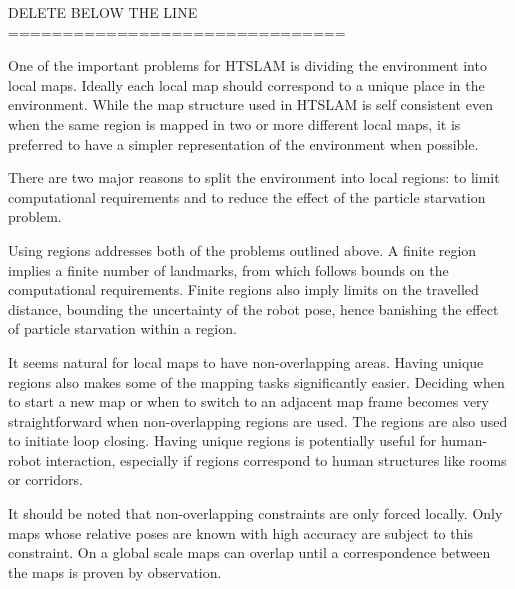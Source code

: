 DELETE BELOW THE LINE\\
===============================

One of the important problems for HTSLAM is dividing the environment
into local maps. Ideally each local map should correspond to a unique
place in the environment. While the map structure used in HTSLAM is
self consistent even when the same region is mapped in two or more
different local maps, it is preferred to have a simpler representation
of the environment when possible.

There are two major reasons to split the environment into local
regions: to limit computational requirements and to reduce the effect
of the particle starvation problem.

Using regions addresses both of the problems outlined above. A finite
region implies a finite number of landmarks, from which follows bounds
on the computational requirements. Finite regions also imply limits on
the travelled distance, bounding the uncertainty of the robot pose,
hence banishing the effect of particle starvation within a region.

It seems natural for local maps to have non-overlapping areas. Having
unique regions also makes some of the mapping tasks significantly
easier. Deciding when to start a new map or when to switch to an
adjacent map frame becomes very straightforward when non-overlapping
regions are used. The regions are also used to initiate loop
closing. Having unique regions is potentially useful for human-robot
interaction, especially if regions correspond to human structures
like rooms or corridors.

It should be noted that non-overlapping constraints are only forced
locally. Only maps whose relative poses are known with high accuracy
are subject to this constraint. On a global scale maps can overlap
until a correspondence between the maps is proven by observation.

